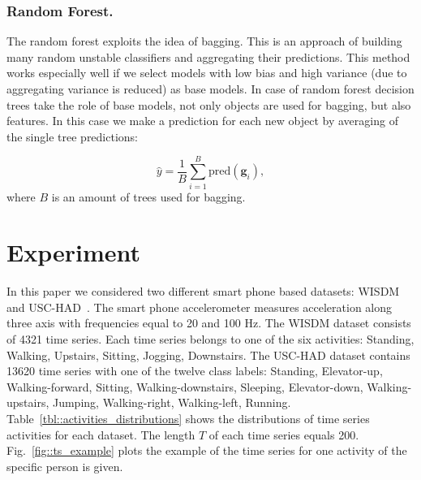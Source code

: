 \documentclass[a4paper,12pt]{article}
\begin{document}
\subsubsection{Random Forest.}
The random forest exploits the idea of bagging. This is an approach of building many random unstable classifiers and aggregating their predictions. This method works especially well if we select models with low bias and high variance (due to aggregating variance is reduced) as base models. In case of random forest decision trees take the role of base models, not only objects are used for bagging, but also features. In this case we make a prediction for each new object by averaging of the single tree predictions:

\begin{equation*}
\hat{y} = \frac{1}{B} \sum_{i=1}^{B} \text{pred}(\boldsymbol{g}_i),
\end{equation*}
where $B$ is an amount of trees used for bagging.

\section{Experiment}
In this paper we considered two different smart phone based datasets: WISDM~\cite{wisdm} and USC-HAD~\cite{usc}. 
The smart phone accelerometer measures acceleration along three axis with frequencies equal to 20 and 100 Hz. 
The WISDM dataset consists of 4321 time series. Each time series belongs to one of the six activities: Standing, Walking, Upstairs, Sitting, Jogging, Downstairs. The USC-HAD dataset contains 13620 time series with one of the twelve class labels: Standing, Elevator-up, Walking-forward, Sitting, Walking-downstairs, Sleeping, Elevator-down, Walking-upstairs, Jumping, Walking-right, Walking-left, Running.
Table~\ref{tbl::activities_distributions} shows the distributions of time series activities for each dataset. 
The length $T$ of each time series equals 200. 
Fig.~\ref{fig::ts_example} plots the example of the time series for one activity of the specific person is given.
\end{document}
